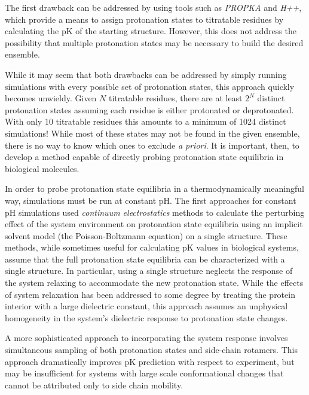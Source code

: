The first drawback can be addressed by using tools such as \emph{PROPKA}
\cite{Olsson2011} and \emph{H++}, \cite{Myers_Proteins_2006_v63_p928} which
provide a means to assign protonation states to titratable residues by
calculating the pK of the starting structure. However, this does not
address the possibility that multiple protonation states may be necessary to
build the desired ensemble.

While it may seem that both drawbacks can be addressed by simply running
simulations with every possible set of protonation states, this approach quickly
becomes unwieldy. Given $N$ titratable residues, there are at least $2^N$
distinct protonation states assuming each residue is either protonated or
deprotonated.  With only 10 titratable residues this amounts to a minimum of
1024 distinct simulations!  While most of these states may not be found in the
given ensemble, there is no way to know which ones to exclude \emph{a priori}.
It is important, then, to develop a method capable of directly probing
protonation state equilibria in biological molecules.

In order to probe protonation state equilibria in a thermodynamically meaningful
way, simulations must be run at constant pH. The first approaches for constant
pH simulations used \emph{continuum electrostatics} methods to calculate the
perturbing effect of the system environment on protonation state equilibria
using an implicit solvent model (\eg the Poisson-Boltzmann equation) on a
single structure. \cite{Bashford_Biochemistry_1990_v29_p10219,
Bashford_JMolBiol_1992_v224_p473, Antosiewicz_JMolBiol_1994_v238_p415} These
methods, while sometimes useful for calculating pK values in biological
systems, assume that the full protonation state equilibria can be characterized
with a single structure. In particular, using a single structure neglects the
response of the system relaxing to accommodate the new protonation state. While
the effects of system relaxation has been addressed to some degree by treating
the protein interior with a large dielectric constant,
\cite{Antosiewicz_JMolBiol_1994_v238_p415} this approach assumes an unphysical
homogeneity in the system's dielectric response to protonation state changes.

A more sophisticated approach to incorporating the system response involves
simultaneous sampling of both protonation states and side-chain rotamers.
\cite{Song_JComputChem_2009_v30_p2231} This approach dramatically improves
pK prediction with respect to experiment, but may be insufficient for
systems with large scale conformational changes that cannot be attributed only
to side chain mobility.

